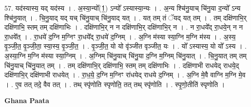 \documentclass[17pt]{extarticle}
\begin{document}
57. यद॑स्यास्य॒ यद् यद॑स्य । . अ॒स्या॒न्यो᳚(1॒) ऽन्यो᳚ ऽस्यास्या॒न्यः । . अ॒न्य श्चि॑नु॒याच् चि॑नु॒या द॒न्यो᳚ ऽन्य श्चि॑नु॒यात् । . चि॒नु॒याद् यद् यच् चि॑नु॒याच् चि॑नु॒याद् यत् । . यत् तम् तं ॅयद् यत् तम् । . तम् दक्षि॑णाभि॒र् दक्षि॑णाभि॒ स्तम् तम् दक्षि॑णाभिः । . दक्षि॑णाभि॒र् न न दक्षि॑णाभि॒र् दक्षि॑णाभि॒र् न । . न रा॒धये᳚द् रा॒धये॒न् न न रा॒धये᳚त् । . रा॒धये॑ द॒ग्नि म॒ग्निꣳ रा॒धये᳚द् रा॒धये॑ द॒ग्निम् । . अ॒ग्नि म॑स्या स्या॒ग्नि म॒ग्नि म॑स्य । . अ॒स्य॒ वृ॒ञ्जी॒त॒ वृ॒ञ्जी॒ता॒ स्या॒स्य॒ वृ॒ञ्जी॒त॒ । . वृ॒ञ्जी॒त॒ यो यो वृ॑ञ्जीत वृञ्जीत॒ यः । . यो᳚ ऽस्यास्य॒ यो यो᳚ ऽस्य । . अ॒स्या॒ग्नि म॒ग्नि म॑स्या स्या॒ग्निम् । . अ॒ग्निम् चि॑नु॒याच् चि॑नु॒या द॒ग्नि म॒ग्निम् चि॑नु॒यात् । . चि॒नु॒यात् तम् तम् चि॑नु॒याच् चि॑नु॒यात् तम् । . तम् दक्षि॑णाभि॒र् दक्षि॑णाभि॒ स्तम् तम् दक्षि॑णाभिः । . दक्षि॑णाभी राधयेद् राधये॒द् दक्षि॑णाभि॒र् दक्षि॑णाभी राधयेत् । . रा॒ध॒ये॒ द॒ग्नि म॒ग्निꣳ रा॑धयेद् राधये द॒ग्निम् । . अ॒ग्नि मे॒वै वाग्नि म॒ग्नि मे॒व । . ए॒व तत् तदे॒ वैव तत् । . तथ् स्पृ॑णोति स्पृणोति॒ तत् तथ् स्पृ॑णोति । . स्पृ॒णो॒तीति॑ स्पृणोति । \newline

\textbf{Ghana Paata } \newline
\end{document}
